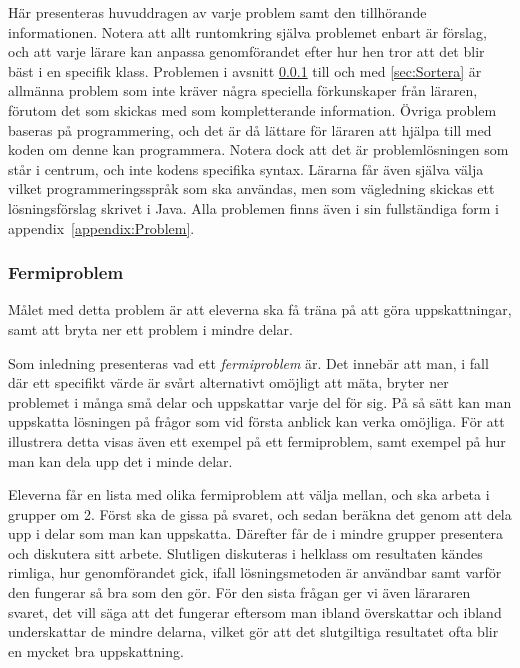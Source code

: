 \textcolor{lila}{Här presenteras huvuddragen av varje problem samt den tillhörande informationen. Notera att allt runtomkring själva problemet enbart är förslag, och att varje lärare kan anpassa genomförandet efter hur hen tror att det blir bäst i en specifik klass. Problemen i avsnitt \ref{sec:Fermi} till och med \ref{sec:Sortera} är allmänna problem som inte kräver några speciella förkunskaper från läraren, förutom det som skickas med som kompletterande information. Övriga problem baseras på programmering, och det är då lättare för läraren att hjälpa till med koden om denne kan programmera. Notera dock att det är problemlösningen som står i centrum, och inte kodens specifika syntax. Lärarna får även själva välja vilket programmeringsspråk som ska användas, men som vägledning skickas ett lösningsförslag skrivet i Java. Alla problemen finns även i sin fullständiga form i appendix~\ref{appendix:Problem}.}

\subsubsection{Fermiproblem}
    \label{sec:Fermi}
 
    \textcolor{lila}{Målet med detta problem är att eleverna ska få träna på att göra uppskattningar, samt att bryta ner ett problem i mindre delar.}
    
    \textcolor{lila}{Som inledning presenteras vad ett \textsl{fermiproblem} är. Det innebär att man, i fall där ett specifikt värde är svårt alternativt omöjligt att mäta, bryter ner problemet i många små delar och uppskattar varje del för sig. På så sätt kan man uppskatta lösningen på frågor som vid första anblick kan verka omöjliga. För att illustrera detta visas även ett exempel på ett fermiproblem, samt exempel på hur man kan dela upp det i minde delar.}

    \textcolor{lila}{Eleverna får en lista med olika fermiproblem att välja mellan, och ska arbeta i grupper om 2. Först ska de gissa på svaret, och sedan beräkna det genom att dela upp i delar som man kan uppskatta. Därefter får de i mindre grupper presentera och diskutera sitt arbete. Slutligen diskuteras i helklass om resultaten kändes rimliga, hur genomförandet gick, ifall lösningsmetoden är användbar samt varför den fungerar så bra som den gör. För den sista frågan ger vi även lärararen svaret, det vill säga att det fungerar eftersom man ibland överskattar och ibland underskattar de mindre delarna, vilket gör att det slutgiltiga resultatet ofta blir en mycket bra uppskattning.}

